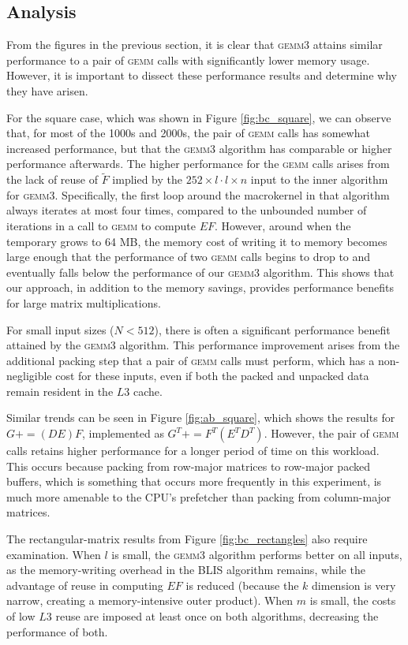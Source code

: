 \documentclass[12pt]{article}
\newcommand*{\pluseq}{\mathrel{{+}{=}}}
\newcommand*{\gemmt}{{\textsc{gemm3}}}
\newcommand*{\gemm}{{\textsc{gemm}}}
\begin{document}
\subsection{Analysis}
From the figures in the previous section, it is clear that \gemmt{} attains similar performance to a pair of \gemm{} calls with significantly lower memory usage.
However, it is important to dissect these performance results and determine why they have arisen.

For the square case, which was shown in Figure \ref{fig:bc_square}, we can observe that, for most of the 1000s and 2000s, the pair of \gemm{} calls has somewhat increased performance, but that the \gemmt{} algorithm has comparable or higher performance afterwards.
The higher performance for the \gemm{} calls arises from the lack of reuse of $\widetilde{F}$ implied by the $252 \times l \cdot l \times n$ input to the inner algorithm for \gemmt{}.
Specifically, the first loop around the macrokernel in that algorithm always iterates at most four times, compared to the unbounded number of iterations in a call to \gemm{} to compute $EF$.
However, around when the temporary grows to 64 MB, the memory cost of writing it to memory becomes large enough that the performance of two \gemm{} calls begins to drop to and eventually falls below the performance of our \gemmt{} algorithm.
This shows that our approach, in addition to the memory savings, provides performance benefits for large matrix multiplications.

For small input sizes ($N < 512$), there is often a significant performance benefit attained by the \gemmt{} algorithm.
This performance improvement arises from the additional packing step that a pair of \gemm{} calls must perform, which has a non-negligible cost for these inputs, even if both the packed and unpacked data remain resident in the $L3$ cache.

Similar trends can be seen in Figure \ref{fig:ab_square}, which shows the results for $G \pluseq (DE)F$, implemented as $G^T \pluseq F^T(E^TD^T)$.
However, the pair of \gemm{} calls retains higher performance for a longer period of time on this workload.
This occurs because packing from row-major matrices to row-major packed buffers, which is something that occurs more frequently in this experiment, is much more amenable to the CPU's prefetcher than packing from column-major matrices.

The rectangular-matrix results from Figure \ref{fig:bc_rectangles} also require examination.
When $l$ is small, the \gemmt{} algorithm performs better on all inputs, as the memory-writing overhead in the BLIS algorithm remains, while the advantage of reuse in computing $EF$ is reduced (because the $k$ dimension is very narrow, creating a memory-intensive outer product).
When $m$ is small, the costs of low $L3$ reuse are imposed at least once on both algorithms, decreasing the performance of both.
\end{document}
